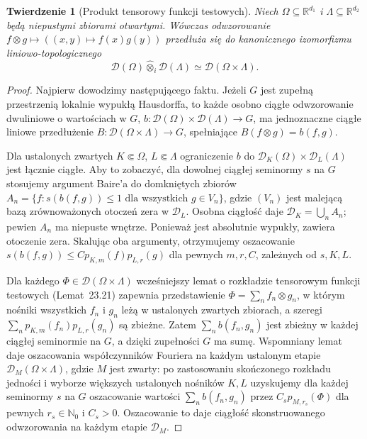 \documentclass[11pt,a4paper]{article}
\numberwithin{equation}{section}
\theoremstyle{plain}
\newtheorem{twierdzenie}{Twierdzenie}[section]
\theoremstyle{definition}
\theoremstyle{remark}
\newcommand{\R}{\mathbb R}
\newcommand{\N}{\mathbb N}
\begin{document}
\begin{twierdzenie}[Produkt tensorowy funkcji testowych]
\label{thm:D-i-product24}
Niech $\Omega\subseteq\R^{d_1}$ i $\Lambda\subseteq\R^{d_2}$
będą niepustymi zbiorami otwartymi. Wówczas odwzorowanie
$f\otimes g\mapsto ((x,y)\mapsto f(x)g(y))$ przedłuża się
do kanonicznego izomorfizmu liniowo-topologicznego
\[
 \mathcal D(\Omega)\widehat\otimes_i\mathcal D(\Lambda)
 \simeq \mathcal D(\Omega\times\Lambda).
\]
\end{twierdzenie}
\begin{proof}
Najpierw dowodzimy następującego faktu. Jeżeli $G$ jest
zupełną przestrzenią lokalnie wypukłą Hausdorffa, to każde
osobno ciągłe odwzorowanie dwuliniowe o wartościach w $G$,
$b:\mathcal D(\Omega)\times\mathcal D(\Lambda)\to G$,
ma jednoznaczne ciągłe liniowe przedłużenie
$B:\mathcal D(\Omega\times\Lambda)\to G$, spełniające
$B(f\otimes g)=b(f,g)$.

Dla ustalonych zwartych $K\Subset\Omega$,
$L\Subset\Lambda$ ograniczenie $b$ do
$\mathcal D_K(\Omega)\times\mathcal D_L(\Lambda)$ jest
łącznie ciągłe. Aby to zobaczyć, dla dowolnej ciągłej
seminormy $s$ na $G$ stosujemy argument Baire'a
do domkniętych zbiorów
$A_n=\{f:s(b(f,g))\le1\text{ dla wszystkich }g\in V_n\}$,
gdzie $(V_n)$ jest malejącą bazą zrównoważonych otoczeń
zera w $\mathcal D_L$. Osobna ciągłość daje
$\mathcal D_K=\bigcup_n A_n$; pewien $A_n$ ma niepuste
wnętrze. Ponieważ jest absolutnie wypukły, zawiera
otoczenie zera. Skalując oba argumenty, otrzymujemy oszacowanie
$s(b(f,g))\le C p_{K,m}(f)p_{L,r}(g)$ dla pewnych
$m,r,C$, zależnych od $s,K,L$.

Dla każdego $\Phi\in\mathcal D(\Omega\times\Lambda)$
wcześniejszy lemat o rozkładzie tensorowym funkcji
testowych (Lemat~\textup{23.21}) zapewnia
przedstawienie $\Phi=\sum_n f_n\otimes g_n$, w którym
nośniki wszystkich $f_n$ i $g_n$ leżą w ustalonych
zwartych zbiorach, a szeregi
$\sum_n p_{K,m}(f_n)p_{L,r}(g_n)$ są zbieżne.
Zatem $\sum_n b(f_n,g_n)$ jest zbieżny w każdej
ciągłej seminormie na $G$, a dzięki zupełności $G$
ma sumę. Wspomniany lemat daje oszacowania współczynników
Fouriera na każdym ustalonym etapie
$\mathcal D_M(\Omega\times\Lambda)$, gdzie $M$ jest zwarty:
po zastosowaniu skończonego rozkładu jedności i wyborze
większych ustalonych nośników $K,L$ uzyskujemy dla
każdej seminormy $s$ na $G$ oszacowanie wartości
$\sum_n b(f_n,g_n)$ przez $C_s p_{M,r_s}(\Phi)$
dla pewnych $r_s\in\N_0$ i $C_s>0$.
Oszacowanie to daje ciągłość skonstruowanego odwzorowania
na każdym etapie $\mathcal D_M$.


\end{proof}
\end{document}
